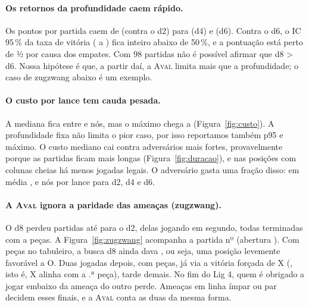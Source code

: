 \documentclass[11pt,a4paper]{article}
\newcommand{\fn}[1]{\textsc{#1}}            %
\begin{document}
\paragraph{Os retornos da profundidade caem rápido.} Os pontos por partida caem de  (contra o d2)
para  (d4) e  (d6). Contra o d6, o IC 95\,\% da taxa de vitória
( a ) fica inteiro abaixo de 50\,\%, e a pontuação está perto de ½ por causa dos
 empates. Com 98 partidas não é possível afirmar que d8 > d6. Nossa hipótese é que, a partir daí,
a \fn{Aval} limita mais que a profundidade; o caso de zugzwang abaixo é um exemplo.

\paragraph{O custo por lance tem cauda pesada.} A mediana fica entre  e  nós,
mas o máximo chega a  (Figura~\ref{fig:custo}). A profundidade fixa não limita o pior caso, por isso
reportamos também p95 e máximo. O custo mediano cai contra adversários mais fortes, provavelmente porque as partidas
ficam mais longas (Figura~\ref{fig:duracao}), e nas posições com colunas cheias há menos jogadas legais. O
adversário gasta uma fração disso: em média ,  e  nós por
lance para d2, d4 e d6.

\paragraph{A \fn{Aval} ignora a paridade das ameaças (zugzwang).} O d8 perdeu  partidas até para o d2,
 delas jogando em segundo, todas terminadas com  a
 peças. A Figura~\ref{fig:zugzwang} acompanha a partida nº  (abertura
). Com  peças no tabuleiro, a busca d8 ainda dava ,
ou seja, uma posição levemente favorável a O. Duas jogadas depois, com  peças, já via a
vitória forçada de X (, isto é, X alinha com a .ª peça), tarde
demais. No fim do Lig 4, quem é obrigado a jogar embaixo da ameaça do outro perde. Ameaças em linha ímpar ou par
decidem esses finais, e a \fn{Aval} conta as duas da mesma forma.
\end{document}
